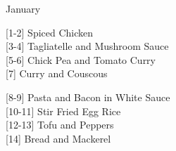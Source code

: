 
    
		\begin{menu}{January}
    
    \begin{recipelist}
    
        {\scriptsize[1-2]} Spiced Chicken\\
        {\scriptsize[3-4]} Tagliatelle and Mushroom Sauce\\
        {\scriptsize[5-6]} Chick Pea and Tomato Curry\\
        {\scriptsize[7]} Curry and Couscous\\%
    \end{recipelist}%
    \begin{recipelist}
    
        {\scriptsize[8-9]} Pasta and Bacon in White Sauce\\
        {\scriptsize[10-11]} Stir Fried Egg Rice\\
        {\scriptsize[12-13]} Tofu and Peppers\\
        {\scriptsize[14]} Bread and Mackerel\\%
    \end{recipelist}\par%
  

\end{menu}
